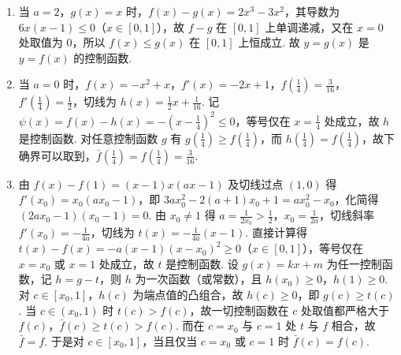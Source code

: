 \begin{solution}
\begin{enumerate}
\item 当 \(a=2\)，\(g\left(x\right)=x\) 时，\(f\left(x\right)-g\left(x\right)=2x^3-3x^2\)，其导数为 \(6x\left(x-1\right)\leqslant0\)（\(x\in\left[0,1\right]\)），故 \(f-g\) 在 \(\left[0,1\right]\) 上单调递减，又在 \(x=0\) 处取值为 \(0\)，所以 \(f\left(x\right)\leqslant g\left(x\right)\) 在 \(\left[0,1\right]\) 上恒成立. 故 \(y=g\left(x\right)\) 是 \(y=f\left(x\right)\) 的控制函数.
\item 当 \(a=0\) 时，\(f\left(x\right)=-x^2+x\)，\(f'\left(x\right)=-2x+1\)，\(f\left(\frac{1}{4}\right)=\frac{3}{16}\)，\(f'\left(\frac{1}{4}\right)=\frac{1}{2}\)，切线为 \(h\left(x\right)=\frac{1}{2}x+\frac{1}{16}\). 记 \(\psi\left(x\right)=f\left(x\right)-h\left(x\right)=-\left(x-\frac{1}{4}\right)^2\leqslant0\)，等号仅在 \(x=\frac{1}{4}\) 处成立，故 \(h\) 是控制函数. 对任意控制函数 \(g\) 有 \(g\left(\frac{1}{4}\right)\geqslant f\left(\frac{1}{4}\right)\)，而 \(h\left(\frac{1}{4}\right)=f\left(\frac{1}{4}\right)\)，故下确界可以取到，\(\bar f\left(\frac{1}{4}\right)=f\left(\frac{1}{4}\right)=\frac{3}{16}\).
\item 由 \(f\left(x\right)-f\left(1\right)=\left(x-1\right)x\left(ax-1\right)\) 及切线过点 \(\left(1,0\right)\) 得 \(f'\left(x_0\right)=x_0\left(ax_0-1\right)\)，即 \(3ax_0^2-2\left(a+1\right)x_0+1=ax_0^2-x_0\)，化简得 \(\left(2ax_0-1\right)\left(x_0-1\right)=0\). 由 \(x_0\neq1\) 得 \(a=\frac{1}{2x_0}>\frac{1}{2}\)，\(x_0=\frac{1}{2a}\)，切线斜率 \(f'\left(x_0\right)=-\frac{1}{4a}\)，切线为 \(t\left(x\right)=-\frac{1}{4a}\left(x-1\right)\). 直接计算得 \(t\left(x\right)-f\left(x\right)=-a\left(x-1\right)\left(x-x_0\right)^2\geqslant0\)（\(x\in\left[0,1\right]\)），等号仅在 \(x=x_0\) 或 \(x=1\) 处成立，故 \(t\) 是控制函数. 设 \(g\left(x\right)=kx+m\) 为任一控制函数，记 \(h=g-t\)，则 \(h\) 为一次函数（或常数），且 \(h\left(x_0\right)\geqslant0\)，\(h\left(1\right)\geqslant0\). 对 \(c\in\left[x_0,1\right]\)，\(h\left(c\right)\) 为端点值的凸组合，故 \(h\left(c\right)\geqslant0\)，即 \(g\left(c\right)\geqslant t\left(c\right)\). 当 \(c\in\left(x_0,1\right)\) 时 \(t\left(c\right)>f\left(c\right)\)，故一切控制函数在 \(c\) 处取值都严格大于 \(f\left(c\right)\)，\(\bar f\left(c\right)\geqslant t\left(c\right)>f\left(c\right)\). 而在 \(c=x_0\) 与 \(c=1\) 处 \(t\) 与 \(f\) 相合，故 \(\bar f=f\). 于是对 \(c\in\left[x_0,1\right]\)，当且仅当 \(c=x_0\) 或 \(c=1\) 时 \(\bar f\left(c\right)=f\left(c\right)\).
\end{enumerate}
\end{solution}
